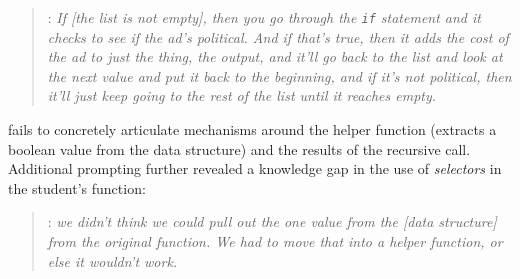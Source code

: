 



\begin{quote}
\sthree: \textit{If [the list
  is not empty], then you go through the \lstinline{if} statement and it checks to see if the ad's political. And if that's true, then it adds the cost of the ad to just the thing, the output, and it'll go back to the list and look at the next value and put it back to the beginning, and if it's not political, then it'll just keep going to the rest of the list until it reaches empty.}
\end{quote}

\sthree fails to concretely articulate mechanisms around the helper
function (extracts a boolean value from the data structure) and
the results of the
recursive call. Additional prompting
further revealed a knowledge gap
in the use of \emph{selectors} in the student's function:

\begin{quote}
\sthree: \textit{we didn't think we could pull out the one value from the [data structure] from the original function. We had to move that into a helper function, or else it wouldn't work.}
\end{quote}

